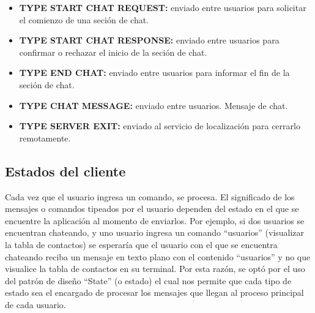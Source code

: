 \begin{itemize}
  \item {\bf TYPE START CHAT REQUEST:} enviado entre usuarios para solicitar el comienzo de una seción de chat.
  \item {\bf TYPE START CHAT RESPONSE:} enviado entre usuarios para confirmar o rechazar el inicio de la seción de chat.
  \item {\bf TYPE END CHAT:} enviado entre usuarios para informar el fin de la seción de chat.
  \item {\bf TYPE CHAT MESSAGE:} enviado entre usuarios. Mensaje de chat.
  \item {\bf TYPE SERVER EXIT:} enviado al servicio de localización para cerrarlo remotamente.
\end{itemize}

\subsection{Estados del cliente}

Cada vez que el usuario ingresa un comando, se procesa. El significado de los mensajes o comandos
tipeados por el usuario dependen del estado en el que se encuentre la aplicación al momento de 
enviarlos. Por ejemplo, si dos usuarios se encuentran chateando, y uno usuario ingresa un comando 
``usuarios'' (visualizar la tabla de contactos) se esperaría que el usuario con el que se encuentra
chateando reciba un mensaje en texto plano con el contenido ``usuarios'' y no que visualice la
tabla de contactos en su terminal. Por esta razón, se optó por el uso del patrón de diseño ``State'' 
(o estado) el cual nos permite que cada tipo de estado sea el encargado de procesar los mensajes que llegan 
al proceso principal de cada usuario. 

